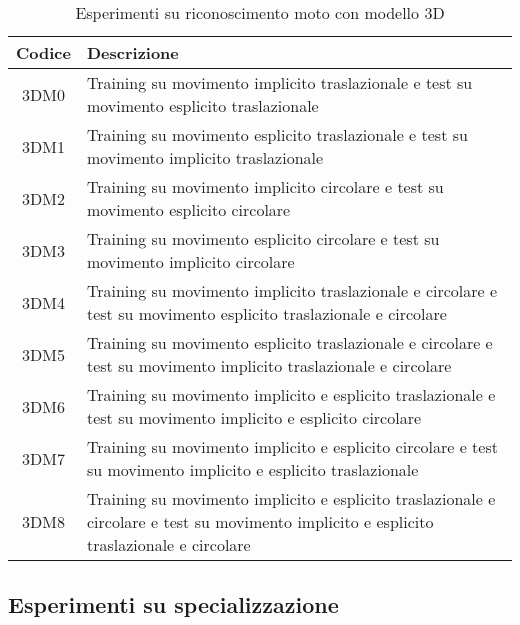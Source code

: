 \begin{table}[H]
	\begin{tabularx}{\textwidth}{|c|X|}
		\hline 
		\textbf{Codice} &
		\textbf{Descrizione} \\ 
		
		\hline 3DM0 &
		Training su movimento implicito traslazionale e test su movimento esplicito traslazionale \\ 
		
		\hline 3DM1 &
		Training su movimento esplicito traslazionale e test su movimento implicito traslazionale \\ 
		
		\hline 3DM2 & 
		Training su movimento implicito circolare e test su movimento esplicito circolare \\ 
		
		\hline 3DM3 & 
		Training su movimento esplicito circolare e test su movimento implicito circolare \\ 
		
		\hline 3DM4 & 
		Training su movimento implicito traslazionale e circolare e test su movimento esplicito traslazionale e circolare \\ 
		
		\hline 3DM5 & 
		Training su movimento esplicito traslazionale e circolare e test su movimento implicito traslazionale e circolare \\ 
		
		\hline 3DM6 & 
		Training su movimento implicito e esplicito traslazionale e test su movimento implicito e esplicito circolare \\
		
		\hline 3DM7 & 
		Training su movimento implicito e esplicito circolare e test su movimento implicito e esplicito traslazionale \\ 
		
		\hline 3DM8 & 
		Training su movimento implicito e esplicito traslazionale e circolare e test su movimento implicito e esplicito traslazionale e circolare \\ 
		\hline 
	\end{tabularx}
	\caption{Esperimenti su riconoscimento moto con modello 3D}
	\label{esperimenti-riconoscimento-3D}
\end{table}

\subsection{Esperimenti su specializzazione}

